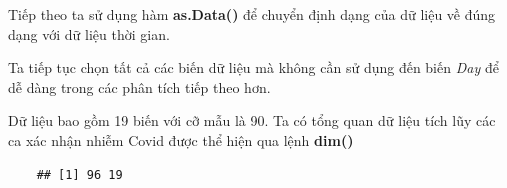 \documentclass[../thesis.tex]{subfiles}
\begin{document}
Tiếp theo ta sử dụng hàm \textbf{as.Data()} để chuyển định dạng của dữ liệu về đúng dạng với dữ liệu thời gian.
\begin{Shaded}
	\begin{Highlighting}[]
\SpecialCharTok{$}\OtherTok{\textless{}{-}} \SpecialCharTok{$} \NormalTok{)}
\SpecialCharTok{$}\OtherTok{\textless{}{-}} \SpecialCharTok{$} \NormalTok{)}
	\end{Highlighting}
\end{Shaded}

Ta tiếp tục chọn tất cả các biến dữ liệu mà không cần sử dụng đến biến \textit{Day} để dễ dàng trong các phân tích tiếp theo hơn.

\begin{Shaded}
	\begin{Highlighting}[]
\OtherTok{\textless{}{-}}\SpecialCharTok{\%\textgreater{}\%} \SpecialCharTok{{-}}
\OtherTok{\textless{}{-}}\SpecialCharTok{\%\textgreater{}\%} \SpecialCharTok{{-}}
	\end{Highlighting}
\end{Shaded}

Dữ liệu bao gồm 19 biến với cỡ mẫu là 90. Ta có tổng quan dữ liệu tích lũy các ca xác nhận nhiễm Covid được thể hiện qua lệnh \textbf{dim()}

\begin{Shaded}
	\begin{Highlighting}[]
\SpecialCharTok{\%\textgreater{}\%} \NormalTok{()}
	\end{Highlighting}
\end{Shaded}

\begin{verbatim}
	## [1] 96 19
\end{verbatim}

\begin{Shaded}
	\begin{Highlighting}[]
\SpecialCharTok{\%\textgreater{}\%} \NormalTok{()}
	\end{Highlighting}
\end{Shaded}
\end{document}
